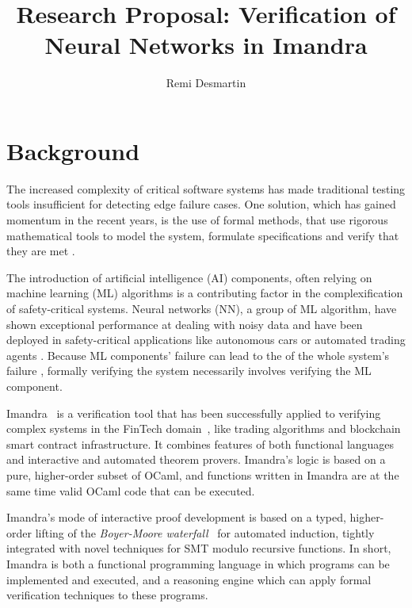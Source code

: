 \documentclass[]{article}
\title{Research Proposal: Verification of Neural Networks in Imandra}
\author{Remi Desmartin}
\begin{document}
\maketitle

\iffalse
\begin{abstract}

\end{abstract}
\fi

\section{Background}
The increased complexity of critical software systems has made traditional testing tools insufficient for detecting edge failure cases. One solution, which has gained momentum in the recent years, is the use of formal methods, that use rigorous mathematical tools to model the system, formulate specifications and verify that they are met \cite{newcombe_how_2015}. 

The introduction of artificial intelligence (AI) components, often relying on machine learning (ML) algorithms is a contributing factor in the complexification of safety-critical systems. Neural networks (NN), a group of ML algorithm, have shown exceptional performance at dealing with noisy data and have been deployed in safety-critical applications like autonomous cars \cite{} or automated trading agents \cite{bao_deep_2017}. Because ML components' failure can lead to the of the whole system's failure \cite{dreossi_compositional_2017}, formally verifying the system necessarily involves verifying the ML component.

Imandra~\cite{passmore_imandra_2020} is a verification tool that has been successfully applied to verifying complex systems in the FinTech
domain~\cite{passmore_lessons_2021}, like trading algorithms and blockchain smart contract infrastructure. It combines features of both functional languages and interactive and automated theorem provers. Imandra's logic is based on a pure, higher-order subset of OCaml, and
functions written in Imandra are at the same time valid OCaml code that can be
executed. 

Imandra's mode of interactive proof
development is based on a typed, higher-order lifting of the \emph{Boyer-Moore
	waterfall}~\cite{boyer_computational_1979} for automated induction, tightly integrated with novel
techniques for SMT modulo recursive functions. 
In short, Imandra is both a functional programming language in which programs can be implemented and executed, and a reasoning engine which can apply formal verification techniques to these programs.
\end{document}
